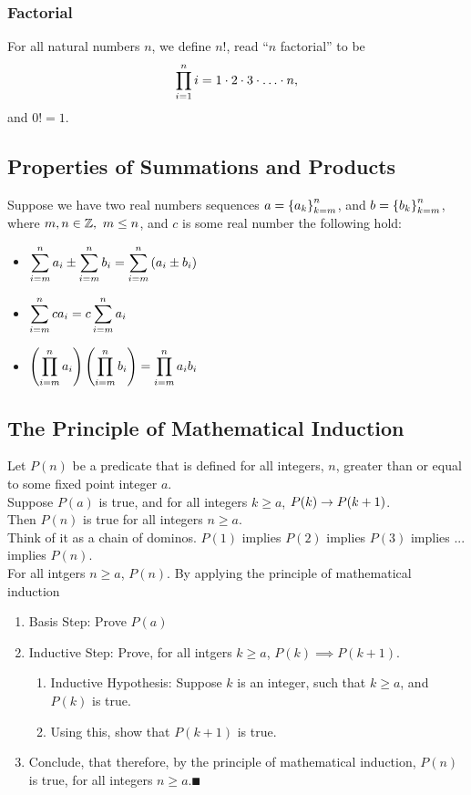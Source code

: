 \documentclass{report}
\begin{document}
\subsubsection*{Factorial}
For all natural numbers $n$, we define $n!$, read ``$n$ factorial'' to be
$$
	\prod_{i=1}^{n} i = 1 \cd 2 \cd 3 \cd \dots \cd n,
$$
and $0! = 1$.

\subsection*{Properties of Summations and Products}
Suppose we have two real numbers sequences $a=\left\lbrace a_k \right\rbrace_{k=m}^{n}$, and $b=\left\lbrace b_k \right\rbrace_{k=m}^{n}$, where $m,n\in\mathbb{Z},\ m\leq n$, and $c$ is some real number the following hold:
\begin{itemize}
	\item $\displaystyle{\sum_{i=m}^{n} a_i \pm \sum_{i=m}^{n} b_i =  \sum_{i=m}^{n} \left(a_i \pm b_i \right)}$
	\item $\displaystyle{\sum_{i=m}^{n} c a_i = c \sum_{i=m}^{n} a_i}$
	\item $\displaystyle{\left(\prod_{i=m}^{n} a_i \right)\left(\prod_{i=m}^{n} b_i \right)= \prod_{i=m}^{n} a_ib_i}$
\end{itemize}

\subsection*{The Principle of Mathematical Induction}
Let $P(n)$ be a predicate that is defined for all integers, $n$, greater than or equal to some fixed point integer $a$. \\

Suppose $P(a)$ is true, and for all integers $k\geq a$, $P(k)\rightarrow P(k+1)$. \\
Then $P(n)$ is true for all integers $n\geq a$. \\

Think of it as a chain of dominos. $P(1)$ implies $P(2)$ implies $P(3)$ implies ... implies $P(n)$. \\

\Lemma For all intgers $n\geq a$, $P(n)$.
\proof By applying the principle of mathematical induction \\
\begin{enumerate}
	\item Basis Step: Prove $P(a)$ 
	\item Inductive Step: Prove, for all intgers $k\geq a$, $P(k)\implies P(k+1)$.
	\begin{enumerate}
		\item Inductive Hypothesis: Suppose $k$ is an integer, such that $k\geq a$, and $P(k)$ is true.
		\item Using this, show that $P(k+1)$ is true.
	\end{enumerate}
	\item Conclude, that therefore, by the principle of mathematical induction, $P(n)$ is true, for all integers $n\geq a. \QED$
\end{enumerate}
\end{document}
